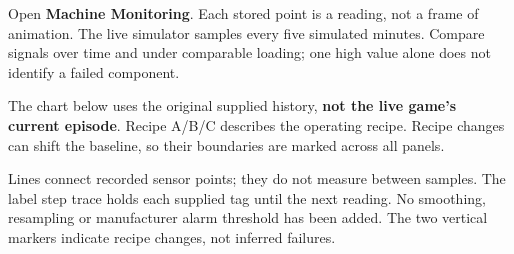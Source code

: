 Open \textbf{Machine Monitoring}. Each stored point is a reading, not a frame of animation. The live simulator samples every five simulated minutes. Compare signals over time and under comparable loading; one high value alone does not identify a failed component.

The chart below uses the original supplied history, \textbf{not the live game's current episode}. Recipe A/B/C describes the operating recipe. Recipe changes can shift the baseline, so their boundaries are marked across all panels.

Lines connect recorded sensor points; they do not measure between samples. The label step trace holds each supplied tag until the next reading. No smoothing, resampling or manufacturer alarm threshold has been added. The two vertical markers indicate recipe changes, not inferred failures.

